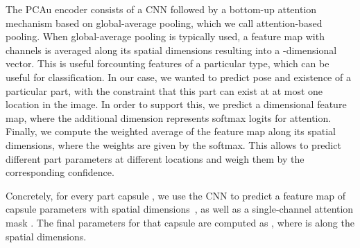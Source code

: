 \documentclass{article}
\begin{document}
The \gls{PCAu} encoder consists of a \gls{CNN} followed by a bottom-up attention mechanism based on global-average pooling, which we call attention-based pooling. 
When global-average pooling is typically used, a feature map with  channels is averaged along its spatial dimensions resulting into a -dimensional vector.
This is useful for\eg counting features of a particular type, which can be useful for classification.
In our case, we wanted to predict pose and existence of a particular part, with the constraint that this part can exist at at most one location in the image.
In order to support this, we predict a  dimensional feature map, where the additional dimension represents softmax logits for attention.
Finally, we compute the weighted average of the feature map along its spatial dimensions, where the weights are given by the softmax.
This allows to predict different part parameters at different locations and weigh them by the corresponding confidence.

Concretely, for every part capsule , we use the \gls{CNN} to predict a feature map  of  capsule parameters with spatial dimensions \,, as well as a single-channel attention mask .
The final parameters for that capsule are computed as , where  is along the spatial dimensions. 
\end{document}
